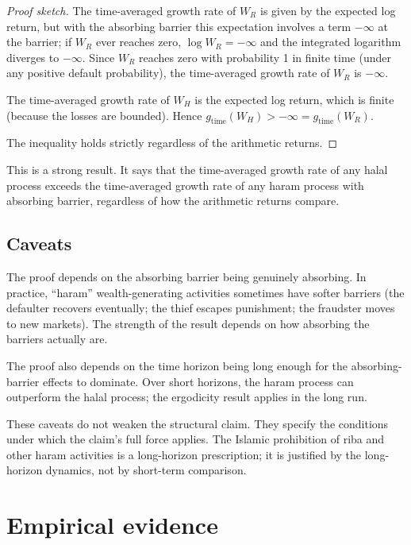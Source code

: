 \begin{proof}[Proof sketch]
The time-averaged growth rate of $W_R$ is given by the expected
log return, but with the absorbing barrier this expectation
involves a term $-\infty$ at the barrier; if $W_R$ ever reaches
zero, $\log W_R = -\infty$ and the integrated logarithm diverges
to $-\infty$. Since $W_R$ reaches zero with probability 1 in
finite time (under any positive default probability), the
time-averaged growth rate of $W_R$ is $-\infty$.

The time-averaged growth rate of $W_H$ is the expected log return,
which is finite (because the losses are bounded). Hence
$g_{\text{time}}(W_H) > -\infty = g_{\text{time}}(W_R)$.

The inequality holds strictly regardless of the arithmetic returns.
\end{proof}

This is a strong result. It says that the time-averaged growth
rate of any halal process exceeds the time-averaged growth rate of
any haram process with absorbing barrier, regardless of how the
arithmetic returns compare.

\subsection{Caveats}

The proof depends on the absorbing barrier being genuinely
absorbing. In practice, ``haram'' wealth-generating activities
sometimes have softer barriers (the defaulter recovers
eventually; the thief escapes punishment; the fraudster moves to
new markets). The strength of the result depends on how absorbing
the barriers actually are.

The proof also depends on the time horizon being long enough for
the absorbing-barrier effects to dominate. Over short horizons,
the haram process can outperform the halal process; the ergodicity
result applies in the long run.

These caveats do not weaken the structural claim. They specify the
conditions under which the claim's full force applies. The Islamic
prohibition of riba and other haram activities is a long-horizon
prescription; it is justified by the long-horizon dynamics, not by
short-term comparison.

\section{Empirical evidence}
\label{sec:halal-empirical}

